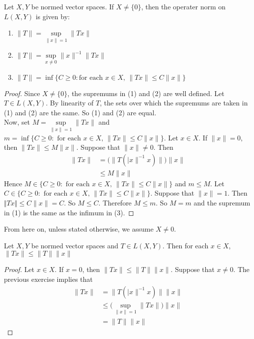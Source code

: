 \documentclass{book}
\begin{document}
	\begin{ex} 
		Let $X,Y$ be normed vector spaces. If $X\neq \{0\}$, then the operater norm on $L(X,Y)$ is given by: 
		\begin{enumerate}
			\item $\|T\| = \sup\limits_{\|x\|=1}\|Tx\|$
			\item $\|T\| = \sup\limits_{x \neq 0}\|x\|^{-1} \|Tx\|$
			\item $\|T\| = \inf \{C \geq 0: \text{for each }x \in X\text{, } \|Tx \|\leq C\|x\|\}$
		\end{enumerate}
	\end{ex}
	
	\begin{proof} Since $X \neq \{0\}$, the supremums in (1) and (2) are well defined. Let $T \in L(X,Y)$. By linearity of $T$, the sets over which the supremums are taken in (1) and (2) are the same. So (1) and (2) are equal.\\
		Now, set $M = \sup\limits_{\|x \|=1} \|Tx \|$ and $m = \inf \{C \geq 0: \text{ for each }x \in X\text{, } \|Tx \|\leq C \|x \|\}$. Let $x \in X$. If $\|x \|=0$, then $\|Tx \|\leq M \|x \|$. Suppose that $\|x \|\neq 0$. Then 
		\begin{align*}
			\|Tx \|
			&= \bigg(\big\|T(|x\|^{-1}x)\big\|\bigg)\|x \|\\
			& \leq M \|x\|
		\end{align*}
		Hence $M \in \{C \geq 0: \text{ for each }x \in X\text{, } \|Tx \|\leq C \|x \|\}$ and $m \leq M$.
		Let $C \in \{C \geq 0: \text{ for each }x \in X\text{, } \|Tx \|\leq C \|x\|\}$. Suppose that $\|x \|=1$. Then $\Vert Tx\Vert \leq C \|x \|= C$. So $M \leq C$. Therefore $M \leq m$. So $M=m$ and the supremum in (1) is the same as the infimum in (3). 
	\end{proof}
	
	\begin{note}
		From here on, unless stated otherwise, we assume $X \neq 0$.
	\end{note}
	
	\begin{ex} 
		Let $X,Y$ be normed vector spaces and $T \in L(X,Y)$. Then for each $x \in X$, $\|Tx \| \leq \|T\|\|x \|$
	\end{ex}
	
	\begin{proof}
		Let $x \in X$. If $x = 0$, then $\|Tx \|\leq \|T \|\|x \|$. Suppose that $x \neq 0$. The previous exercise implies that 
		\begin{align*}
			\|Tx \|
			& = \| T(|x\|^{-1} x)\| \|x\| \\
			& \leq \bigg( \sup\limits_{\|x\|=1}\|Tx\| \bigg) \|x\| \\
			& =  \|T\| \|x\|
		\end{align*}
	\end{proof}
	
\end{document}
